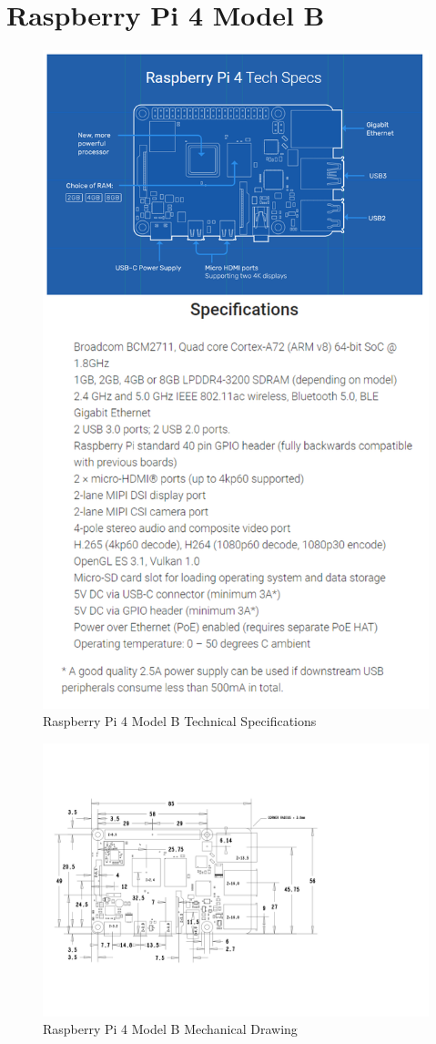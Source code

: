\section{Raspberry Pi 4 Model B}
\label{appendix:raspberry-pi-4-model-b}

\begin{figure}[H]
    \centering
    \includegraphics[width=0.7\linewidth]{texs/appendix/data/techspecs/pi-specs.png}
    \caption{Raspberry Pi 4 Model B Technical Specifications}
    \label{fig:rpi-1}
\end{figure}

\begin{figure}[H]
    \centering
    \includegraphics[width=\linewidth, angle=90]{texs/appendix/data/techspecs/pimechdraw.jpg}
    \caption{Raspberry Pi 4 Model B Mechanical Drawing}
    \label{fig:rpi-2}
\end{figure}

